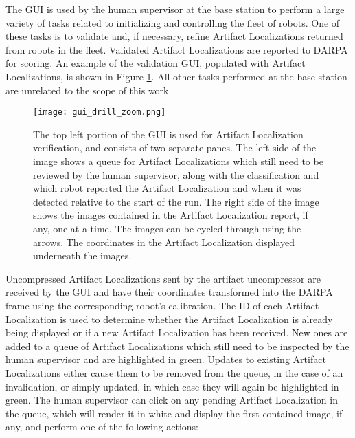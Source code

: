 The GUI is used by the human supervisor at the base station to perform a large variety of tasks related to initializing and controlling the fleet of robots. One of these tasks is to validate and, if necessary, refine Artifact Localizations returned from robots in the fleet. Validated Artifact Localizations are reported to DARPA for scoring. An example of the validation GUI, populated with Artifact Localizations, is shown in Figure \ref{gui}. All other tasks performed at the base station are unrelated to the scope of this work.

\begin{figure}
	\centering
	\texttt{[image: gui\_drill\_zoom.png]}
	\caption[GUI used for artifact localization validation]{The top left portion of the GUI is used for Artifact Localization verification, and consists of two separate panes. The left side of the image shows a queue for Artifact Localizations which still need to be reviewed by the human supervisor, along with the classification and which robot reported the Artifact Localization and when it was detected relative to the start of the run. The right side of the image shows the images contained in the Artifact Localization report, if any, one at a time. The images can be cycled through using the arrows. The coordinates in the Artifact Localization displayed underneath the images.}
	\label{gui}
\end{figure}

Uncompressed Artifact Localizations sent by the artifact uncompressor are received by the GUI and have their coordinates transformed into the DARPA frame using the corresponding robot's calibration. The ID of each Artifact Localization is used to determine whether the Artifact Localization is already being displayed or if a new Artifact Localization has been received. New ones are added to a queue of Artifact Localizations which still need to be inspected by the human supervisor and are highlighted in green. Updates to existing Artifact Localizations either cause them to be removed from the queue, in the case of an invalidation, or simply updated, in which case they will again be highlighted in green. The human supervisor can click on any pending Artifact Localization in the queue, which will render it in white and display the first contained image, if any, and perform one of the following actions:

